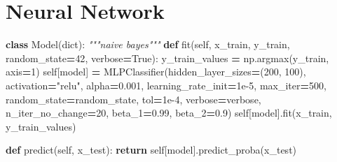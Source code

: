 \documentclass[
]{article}
\newenvironment{Shaded}{\begin{snugshade}}{\end{snugshade}}
\newcommand{\BuiltInTok}[1]{#1}
\newcommand{\CommentTok}[1]{\textcolor[rgb]{0.56,0.35,0.01}{\textit{#1}}}
\newcommand{\ControlFlowTok}[1]{\textcolor[rgb]{0.13,0.29,0.53}{\textbf{#1}}}
\newcommand{\DecValTok}[1]{\textcolor[rgb]{0.00,0.00,0.81}{#1}}
\newcommand{\FloatTok}[1]{\textcolor[rgb]{0.00,0.00,0.81}{#1}}
\newcommand{\KeywordTok}[1]{\textcolor[rgb]{0.13,0.29,0.53}{\textbf{#1}}}
\newcommand{\NormalTok}[1]{#1}
\newcommand{\OperatorTok}[1]{\textcolor[rgb]{0.81,0.36,0.00}{\textbf{#1}}}
\newcommand{\StringTok}[1]{\textcolor[rgb]{0.31,0.60,0.02}{#1}}
\newcommand{\VariableTok}[1]{\textcolor[rgb]{0.00,0.00,0.00}{#1}}
\begin{document}
\section{Neural Network}\label{neural-network}

\begin{Shaded}
\begin{Highlighting}[]

\KeywordTok{class}\NormalTok{ Model(}\BuiltInTok{dict}\NormalTok{):}
    \CommentTok{"""naive bayes"""}
    \KeywordTok{def}\NormalTok{ fit(}\VariableTok{self}\NormalTok{, x\_train, y\_train, random\_state}\OperatorTok{=}\DecValTok{42}\NormalTok{, verbose}\OperatorTok{=}\VariableTok{True}\NormalTok{):}
\NormalTok{        y\_train\_values }\OperatorTok{=}\NormalTok{ np.argmax(y\_train, axis}\OperatorTok{=}\DecValTok{1}\NormalTok{)}
        \VariableTok{self}\NormalTok{[}\StringTok{\textquotesingle{}model\textquotesingle{}}\NormalTok{] }\OperatorTok{=}\NormalTok{ MLPClassifier(hidden\_layer\_sizes}\OperatorTok{=}\NormalTok{(}\DecValTok{200}\NormalTok{, }\DecValTok{100}\NormalTok{),}
\NormalTok{                                      activation}\OperatorTok{=}\StringTok{"relu"}\NormalTok{,}
\NormalTok{                                      alpha}\OperatorTok{=}\FloatTok{0.001}\NormalTok{,}
\NormalTok{                                      learning\_rate\_init}\OperatorTok{=}\FloatTok{1e{-}5}\NormalTok{,}
\NormalTok{                                      max\_iter}\OperatorTok{=}\DecValTok{500}\NormalTok{,}
\NormalTok{                                      random\_state}\OperatorTok{=}\NormalTok{random\_state,}
\NormalTok{                                      tol}\OperatorTok{=}\FloatTok{1e{-}4}\NormalTok{,}
\NormalTok{                                      verbose}\OperatorTok{=}\NormalTok{verbose,}
\NormalTok{                                      n\_iter\_no\_change}\OperatorTok{=}\DecValTok{20}\NormalTok{,}
\NormalTok{                                      beta\_1}\OperatorTok{=}\FloatTok{0.99}\NormalTok{,}
\NormalTok{                                      beta\_2}\OperatorTok{=}\FloatTok{0.9}\NormalTok{)}
        \VariableTok{self}\NormalTok{[}\StringTok{\textquotesingle{}model\textquotesingle{}}\NormalTok{].fit(x\_train, y\_train\_values)}

    \KeywordTok{def}\NormalTok{ predict(}\VariableTok{self}\NormalTok{, x\_test):}
        \ControlFlowTok{return} \VariableTok{self}\NormalTok{[}\StringTok{\textquotesingle{}model\textquotesingle{}}\NormalTok{].predict\_proba(x\_test)}



\end{Highlighting}
\end{Shaded}
\end{document}

